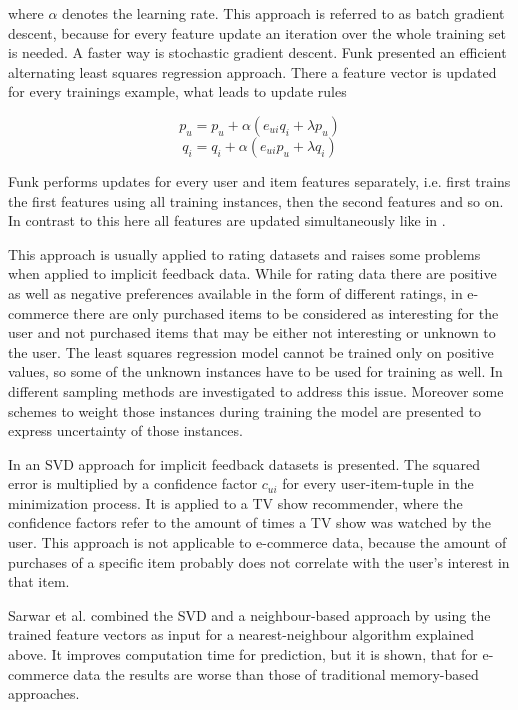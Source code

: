 \documentclass[10pt]{reportMaster}
\begin{document}
where $\alpha$ denotes the learning rate.
This approach is referred to as batch gradient descent, because for every feature update an iteration over the whole training set is needed.
A faster way is stochastic gradient descent.
Funk \cite{funkLeastSquares} presented an efficient alternating least squares regression approach.
There a feature vector is updated for every trainings example, what leads to update rules 

\begin{equation}
	p_u = p_u + \alpha (e_{ui} q_i + \lambda p_u)
\end{equation}
\begin{equation}
	q_i = q_i + \alpha (e_{ui} p_u + \lambda q_i)
\end{equation}

Funk performs updates for every user and item features separately, i.e. first trains the first features using all training instances, then the second features and so on.
In contrast to this here all features are updated simultaneously like in \cite{matrixFactorizationDifRegParam}.

This approach is usually applied to rating datasets and raises some problems when applied to implicit feedback data.
While for rating data there are positive as well as negative preferences available in the form of different ratings, in e-commerce there are only purchased items to be considered as interesting for the user and not purchased items that may be either not interesting or unknown to the user.
The least squares regression model cannot be trained only on positive values, so some of the unknown instances have to be used for training as well.
In \cite{occf} different sampling methods are investigated to address this issue.
Moreover some schemes to weight those instances during training the model are presented to express uncertainty of those instances.

In \cite{CFForImplFeedback} an SVD approach for implicit feedback datasets is presented.
The squared error is multiplied by a confidence factor $c_{ui}$ for every user-item-tuple in the minimization process.
It is applied to a TV show recommender, where the confidence factors refer to the amount of times a TV show was watched by the user.
This approach is not applicable to e-commerce data, because the amount of purchases of a specific item probably does not correlate with the user's interest in that item.

Sarwar et al. \cite{nnOnSvd} combined the SVD and a neighbour-based approach by using the trained feature vectors as input for a nearest-neighbour algorithm explained above.
It improves computation time for prediction, but it is shown, that for e-commerce data the results are worse than those of traditional memory-based approaches.
\end{document}
